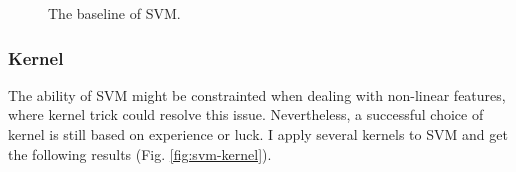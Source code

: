 \documentclass[12pt,a4paper]{article}
\theoremstyle{definition}
\begin{document}
\begin{figure}[H]
	\centering
	\caption{The baseline of SVM.}
	\label{fig:svm-baseline}
\end{figure}

\subsubsection{Kernel}

The ability of SVM might be constrainted when dealing with non-linear features, where kernel trick could resolve this issue. Nevertheless, a successful choice of kernel is still based on experience or luck. I apply several kernels to SVM and get the following results (Fig. \ref{fig:svm-kernel}).
\end{document}
